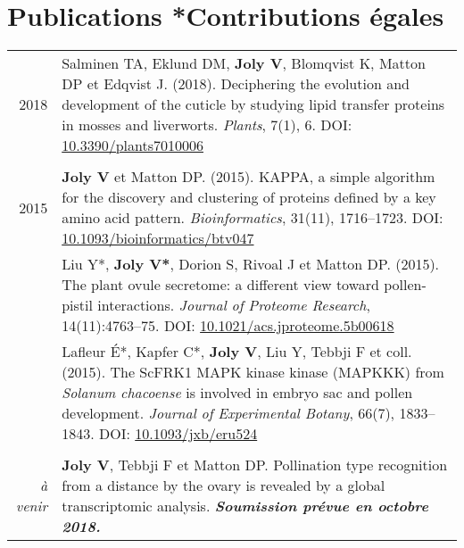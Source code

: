 \documentclass[letterpaper,12pt]{article}
\begin{document}
\section[Publications]{Publications \hfill \small{*Contributions égales}}
\begin{tabularx}{\textwidth}{@{}r|X@{}}

2018

& Salminen TA, Eklund DM, \textbf{Joly V}, Blomqvist K, Matton DP
  et Edqvist J. (2018).
  Deciphering the evolution and development of the cuticle by studying lipid
  transfer proteins in mosses and liverworts.
  \emph{Plants}, 7(1), 6.
  DOI: \href{http://doi.org/10.3390/plants7010006}{10.3390/plants7010006} \\

\multicolumn{2}{c}{} \\

2015
& \textbf{Joly V} et Matton DP. (2015).
  KAPPA, a simple algorithm for the discovery and clustering of proteins defined by
  a key amino acid pattern.
  \emph{Bioinformatics}, 31(11), 1716--1723.
  DOI: \href{http://doi.org/10.1093/bioinformatics/btv047}
  {10.1093/bioinformatics/btv047}
  \vspace{3mm} \\

& Liu Y*, \textbf{Joly V*}, Dorion S, Rivoal J et Matton DP. (2015).
  The plant ovule secretome: a different view toward pollen-pistil interactions.
  \emph{Journal of Proteome Research}, 14(11):4763--75.
  DOI: \href{http://doi.org/10.1021/acs.jproteome.5b00618}
  {10.1021/acs.jproteome.5b00618}
  \vspace{3mm} \\

& Lafleur É*, Kapfer C*, \textbf{Joly V}, Liu Y, Tebbji F et coll. (2015).
  The ScFRK1 MAPK kinase kinase (MAPKKK) from \emph{Solanum chacoense} is
  involved in embryo sac and pollen development.
  \emph{Journal of Experimental Botany}, 66(7), 1833--1843.
  DOI: \href{http://doi.org/10.1093/jxb/eru524}{10.1093/jxb/eru524}
  \\

\multicolumn{2}{c}{} \\

{\em à venir}

& \textbf{Joly V}, Tebbji F et Matton DP.
  Pollination type recognition from a distance by the ovary is revealed by a global transcriptomic analysis. {\bfseries\em Soumission prévue en octobre 2018.} \vspace{3mm} \\


\end{tabularx}
\end{document}
